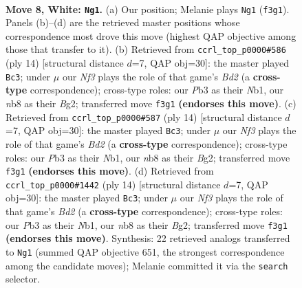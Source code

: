 \documentclass[11pt]{article}
\begin{document}
\begin{figure}[p]\centering
\begin{subfigure}{0.46\textwidth}\centering
\resizebox{\linewidth}{!}{%
\newchessgame
\chessboard[
  setfen={rn1qk2r/p1ppbpp1/bp2pn2/7p/2PP4/1P3NP1/P2BPPBP/RN1QK2R w KQkq - 0 8},
  showmover=false,
  pgfstyle=straightmove, color=movearrow, markmove={f3-g1}
]}
\caption{}
\end{subfigure}\hfill
\begin{subfigure}{0.46\textwidth}\centering
\resizebox{\linewidth}{!}{%
\newchessgame
\chessboard[
  setfen={rn1qk2r/p2pbppp/bpp1pn2/8/2PP4/1P3NP1/P2BPPBP/RN1QK2R w KQkq - 0 8},
  showmover=false,
  pgfstyle=straightmove, color=movearrow, markmove={d2-c3}
]}
\caption{}
\end{subfigure}
\\[4pt]
\begin{subfigure}{0.46\textwidth}\centering
\resizebox{\linewidth}{!}{%
\newchessgame
\chessboard[
  setfen={rn1qk2r/p2pbppp/bpp1pn2/8/2PP4/1P3NP1/P2BPPBP/RN1QK2R w KQkq - 0 8},
  showmover=false,
  pgfstyle=straightmove, color=movearrow, markmove={d2-c3}
]}
\caption{}
\end{subfigure}\hfill
\begin{subfigure}{0.46\textwidth}\centering
\resizebox{\linewidth}{!}{%
\newchessgame
\chessboard[
  setfen={rn1qk2r/p2pbppp/bpp1pn2/8/2PP4/1P3NP1/P2BPPBP/RN1QK2R w KQkq - 0 8},
  showmover=false,
  pgfstyle=straightmove, color=movearrow, markmove={d2-c3}
]}
\caption{}
\end{subfigure}
\caption{\textbf{Move 8, White: \texttt{Ng1}.} (a) Our position; Melanie plays \texttt{Ng1} (\texttt{f3g1}). Panels (b)--(d) are the retrieved master positions whose correspondence most drove this move (highest QAP objective among those that transfer to it). (b) Retrieved from \texttt{ccrl\_top\_p0000\#586} (ply 14) [structural distance $d$=7, QAP obj=30]: the master played \texttt{Bc3}; under $\mu$ our \emph{Nf3} plays the role of that game's \emph{Bd2} (a \textbf{cross-type} correspondence); cross-type roles: our \emph{P}b3 as their \emph{N}b1, our \emph{n}b8 as their \emph{B}g2; transferred move \texttt{f3g1} \textbf{(endorses this move)}. (c) Retrieved from \texttt{ccrl\_top\_p0000\#587} (ply 14) [structural distance $d$=7, QAP obj=30]: the master played \texttt{Bc3}; under $\mu$ our \emph{Nf3} plays the role of that game's \emph{Bd2} (a \textbf{cross-type} correspondence); cross-type roles: our \emph{P}b3 as their \emph{N}b1, our \emph{n}b8 as their \emph{B}g2; transferred move \texttt{f3g1} \textbf{(endorses this move)}. (d) Retrieved from \texttt{ccrl\_top\_p0000\#1442} (ply 14) [structural distance $d$=7, QAP obj=30]: the master played \texttt{Bc3}; under $\mu$ our \emph{Nf3} plays the role of that game's \emph{Bd2} (a \textbf{cross-type} correspondence); cross-type roles: our \emph{P}b3 as their \emph{N}b1, our \emph{n}b8 as their \emph{B}g2; transferred move \texttt{f3g1} \textbf{(endorses this move)}. Synthesis: 22 retrieved analogs transferred to \texttt{Ng1} (summed QAP objective 651, the strongest correspondence among the candidate moves); Melanie committed it via the \texttt{search} selector.}
\label{fig:thought-m14}
\end{figure}
\end{document}
